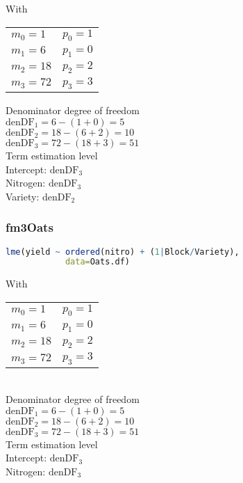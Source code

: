 \documentclass[a4paper,12pt]{article}
\begin{document}
		With\\[1mm]
		\begin{tabular}{m{9cm}m{5cm}}
			$m_0 = 1$ & $p_0 = 1$ \\
			$m_1 = 6$ & $p_1 = 0$ \\
			$m_2 = 18$ & $p_2 = 2$ \\
			$m_3 = 72$ & $p_3 = 3$
		\end{tabular}
		
		Denominator degree of freedom\\[1mm]
		$\text{denDF}_1 = 6 - (1 + 0) = 5$\\
		$\text{denDF}_2 = 18 - (6 + 2) = 10$\\
		$\text{denDF}_3 = 72 - (18 + 3) = 51$\\
		
		Term estimation level\\[1mm]
		Intercept: $\text{denDF}_3$\\
		Nitrogen: $\text{denDF}_3$\\
		Variety: $\text{denDF}_2$\\[2em]
		
		\subsubsection*{fm3Oats}
		\begin{lstlisting}[language=R]
lme(yield ~ ordered(nitro) + (1|Block/Variety),
            data=Oats.df)
		\end{lstlisting}
		
		With\\[1mm]
		\begin{tabular}{m{9cm}m{5cm}}
			$m_0 = 1$ & $p_0 = 1$ \\
			$m_1 = 6$ & $p_1 = 0$ \\
			$m_2 = 18$ & $p_2 = 2$ \\
			$m_3 = 72$ & $p_3 = 3$
		\end{tabular}\\
		
		\newpage
		Denominator degree of freedom\\[1mm]
		$\text{denDF}_1 = 6 - (1 + 0) = 5$\\
		$\text{denDF}_2 = 18 - (6 + 2) = 10$\\
		$\text{denDF}_3 = 72 - (18 + 3) = 51$\\
		
		Term estimation level\\[1mm]
		Intercept: $\text{denDF}_3$\\
		Nitrogen: $\text{denDF}_3$\\[2em]
	
\end{document}
